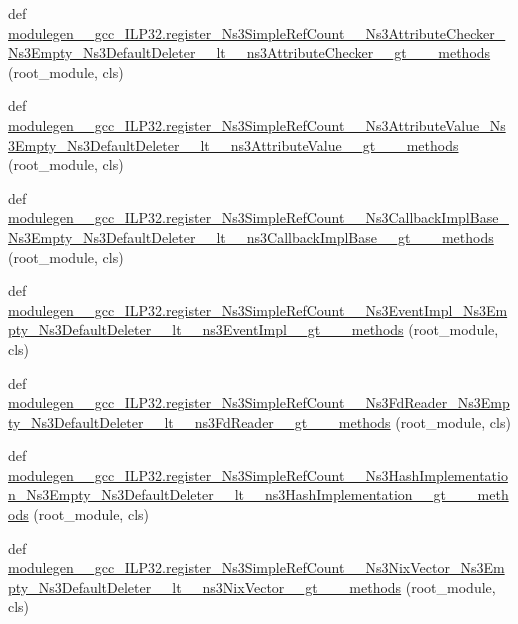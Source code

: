 \begin{DoxyCompactItemize}
\item 
def \hyperlink{namespacemodulegen____gcc__ILP32_a8e35760026d969bed52bf02d5751f184}{modulegen\+\_\+\+\_\+gcc\+\_\+\+I\+L\+P32.\+register\+\_\+\+Ns3\+Simple\+Ref\+Count\+\_\+\+\_\+\+Ns3\+Attribute\+Checker\+\_\+\+Ns3\+Empty\+\_\+\+Ns3\+Default\+Deleter\+\_\+\+\_\+lt\+\_\+\+\_\+ns3\+Attribute\+Checker\+\_\+\+\_\+gt\+\_\+\+\_\+\+\_\+methods} (root\+\_\+module, cls)
\item 
def \hyperlink{namespacemodulegen____gcc__ILP32_ae37f0969d06fd5e11e962c9b2a58d222}{modulegen\+\_\+\+\_\+gcc\+\_\+\+I\+L\+P32.\+register\+\_\+\+Ns3\+Simple\+Ref\+Count\+\_\+\+\_\+\+Ns3\+Attribute\+Value\+\_\+\+Ns3\+Empty\+\_\+\+Ns3\+Default\+Deleter\+\_\+\+\_\+lt\+\_\+\+\_\+ns3\+Attribute\+Value\+\_\+\+\_\+gt\+\_\+\+\_\+\+\_\+methods} (root\+\_\+module, cls)
\item 
def \hyperlink{namespacemodulegen____gcc__ILP32_a1725745354fc64e505a347b59ad09428}{modulegen\+\_\+\+\_\+gcc\+\_\+\+I\+L\+P32.\+register\+\_\+\+Ns3\+Simple\+Ref\+Count\+\_\+\+\_\+\+Ns3\+Callback\+Impl\+Base\+\_\+\+Ns3\+Empty\+\_\+\+Ns3\+Default\+Deleter\+\_\+\+\_\+lt\+\_\+\+\_\+ns3\+Callback\+Impl\+Base\+\_\+\+\_\+gt\+\_\+\+\_\+\+\_\+methods} (root\+\_\+module, cls)
\item 
def \hyperlink{namespacemodulegen____gcc__ILP32_a8101c8d46fb3608fb9b8e22e680f1793}{modulegen\+\_\+\+\_\+gcc\+\_\+\+I\+L\+P32.\+register\+\_\+\+Ns3\+Simple\+Ref\+Count\+\_\+\+\_\+\+Ns3\+Event\+Impl\+\_\+\+Ns3\+Empty\+\_\+\+Ns3\+Default\+Deleter\+\_\+\+\_\+lt\+\_\+\+\_\+ns3\+Event\+Impl\+\_\+\+\_\+gt\+\_\+\+\_\+\+\_\+methods} (root\+\_\+module, cls)
\item 
def \hyperlink{namespacemodulegen____gcc__ILP32_afff466451691de20c97e1cd19549efc8}{modulegen\+\_\+\+\_\+gcc\+\_\+\+I\+L\+P32.\+register\+\_\+\+Ns3\+Simple\+Ref\+Count\+\_\+\+\_\+\+Ns3\+Fd\+Reader\+\_\+\+Ns3\+Empty\+\_\+\+Ns3\+Default\+Deleter\+\_\+\+\_\+lt\+\_\+\+\_\+ns3\+Fd\+Reader\+\_\+\+\_\+gt\+\_\+\+\_\+\+\_\+methods} (root\+\_\+module, cls)
\item 
def \hyperlink{namespacemodulegen____gcc__ILP32_a59dad6cf46a3eb90ab74f8388a4708b9}{modulegen\+\_\+\+\_\+gcc\+\_\+\+I\+L\+P32.\+register\+\_\+\+Ns3\+Simple\+Ref\+Count\+\_\+\+\_\+\+Ns3\+Hash\+Implementation\+\_\+\+Ns3\+Empty\+\_\+\+Ns3\+Default\+Deleter\+\_\+\+\_\+lt\+\_\+\+\_\+ns3\+Hash\+Implementation\+\_\+\+\_\+gt\+\_\+\+\_\+\+\_\+methods} (root\+\_\+module, cls)
\item 
def \hyperlink{namespacemodulegen____gcc__ILP32_acf2fe3353b3614ad36d5edc27d55dc08}{modulegen\+\_\+\+\_\+gcc\+\_\+\+I\+L\+P32.\+register\+\_\+\+Ns3\+Simple\+Ref\+Count\+\_\+\+\_\+\+Ns3\+Nix\+Vector\+\_\+\+Ns3\+Empty\+\_\+\+Ns3\+Default\+Deleter\+\_\+\+\_\+lt\+\_\+\+\_\+ns3\+Nix\+Vector\+\_\+\+\_\+gt\+\_\+\+\_\+\+\_\+methods} (root\+\_\+module, cls)

\end{DoxyCompactItemize}
